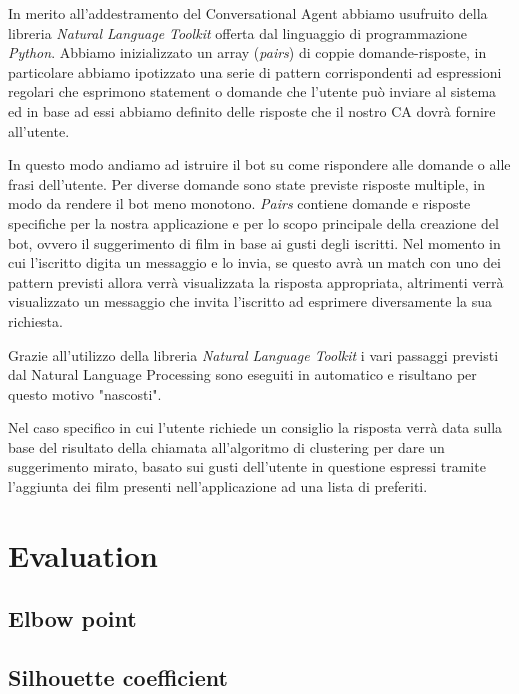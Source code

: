 \documentclass[a4paper, 10pt]{report}
\begin{document}
            In merito all'addestramento del Conversational Agent abbiamo usufruito della libreria \textit{Natural Language Toolkit}
            offerta dal linguaggio di programmazione \textit{Python}. Abbiamo inizializzato un array (\textit{pairs}) di coppie domande-risposte,
            in particolare abbiamo ipotizzato una serie di pattern corrispondenti ad espressioni regolari che esprimono statement o domande che
            l'utente può inviare al sistema ed in base ad essi abbiamo definito delle risposte che il nostro CA dovrà fornire all'utente.

            In questo modo andiamo ad istruire il bot su come rispondere alle domande o alle frasi dell'utente. Per diverse domande
            sono state previste risposte multiple, in modo da rendere il bot meno monotono.
            \textit{Pairs} contiene domande e risposte specifiche per la nostra applicazione e per lo scopo
            principale della creazione del bot, ovvero il suggerimento di film in base ai gusti degli iscritti.
            Nel momento in cui l'iscritto digita un messaggio e lo invia, se questo avrà un match con uno dei pattern previsti allora
            verrà visualizzata la risposta appropriata, altrimenti verrà visualizzato un messaggio che invita l'iscritto
            ad esprimere diversamente la sua richiesta.

            Grazie all'utilizzo della libreria \textit{Natural Language Toolkit} i vari passaggi previsti dal Natural Language Processing
            sono eseguiti in automatico e risultano per questo motivo "nascosti".

            Nel caso specifico in cui l'utente richiede un consiglio la risposta verrà data sulla base del risultato della chiamata
            all'algoritmo di clustering per dare un suggerimento mirato, basato sui gusti dell'utente in questione espressi tramite
            l'aggiunta dei film presenti nell'applicazione ad una lista di preferiti.



    \chapter{Evaluation}\label{ch:evaluation}

        \section{Elbow point}\label{sec:elbow-point}


        \section{Silhouette coefficient}\label{sec:silhouette-coefficient}
\end{document}
